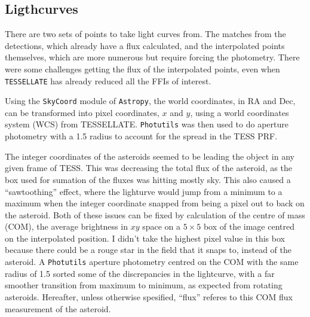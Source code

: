 \documentclass{UCreport}
\begin{document}
\subsection{Ligthcurves}\label{SubSec:Lightcurves}

There are two sets of points to take light curves from.
The matches from the detections, which already have a flux calculated, and the interpolated points themselves, which are more numerous but require forcing the photometry.
There were some challenges getting the flux of the interpolated points, even when \texttt{TESSELLATE} has already reduced all the FFIs of interest.

Using the \texttt{SkyCoord} module of \texttt{Astropy}, the world coordinates, in RA and Dec, can be transformed into pixel coordinates, $x$ and $y$, using a world coordinates system (WCS) from TESSELLATE.
\texttt{Photutils} \citep{Bradley2024} was then used to do aperture photometry with a \qty{1.5}{\px} radius to account for the spread in the TESS PRF. %

The integer coordinates of the asteroids seemed to be leading the object in any given frame of TESS. %
This was decreasing the total flux of the asteroid, as the box used for sumation of the fluxes was hitting mostly sky.
This also caused a ``sawtoothing'' effect, where the lighturve would jump from a minimum to a maximum when the integer coordinate snapped from being a pixel out to back on the asteroid.
Both of these issues can be fixed by calculation of the centre of mass (COM), the average brightness in $xy$ space on a $5\times5$ \unit{\px} box of the image centred on the interpolated position.
I didn't take the highest pixel value in this box because there could be a rouge star in the field that it snaps to, instead of the asteroid.
A \texttt{Photutils} aperture photometry centred on the COM with the same radius of \qty{1.5}{\px} sorted some of the discrepancies in the lightcurve, with a far smoother transition from maximum to minimum, as expected from rotating asteroids. Hereafter, unless otherwise spesified, ``flux'' referes to this COM flux measurement of the asteroid.
\end{document}
